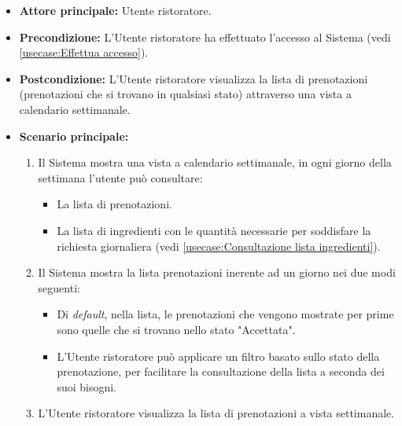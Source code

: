 \begin{itemize}
	\item \textbf{Attore principale:} Utente ristoratore.

	\item \textbf{Precondizione:} L'Utente ristoratore ha effettuato l'accesso al Sistema (vedi \autoref{usecase:Effettua accesso}).

	\item \textbf{Postcondizione:} L'Utente ristoratore visualizza la lista di prenotazioni (prenotazioni che si trovano in qualsiasi stato) attraverso una vista a calendario settimanale.

	\item \textbf{Scenario principale:}
	      \begin{enumerate}
		      \item Il Sistema mostra una vista a calendario settimanale, in ogni giorno della settimana l'utente può consultare:
		            \begin{itemize}
			            \item La lista di prenotazioni.
			            \item La lista di ingredienti con le quantità necessarie per soddisfare la richiesta giornaliera (vedi \autoref{usecase:Consultazione lista ingredienti}).
		            \end{itemize}

		      \item Il Sistema mostra la lista prenotazioni inerente ad un giorno nei due modi seguenti:
		            \begin{itemize}
			            \item Di \textit{default}, nella lista, le prenotazioni che vengono mostrate per prime sono quelle che si trovano nello stato "Accettata".

			            \item L'Utente ristoratore può applicare un filtro basato sullo stato della prenotazione, per facilitare la consultazione della lista a seconda dei suoi bisogni.
		            \end{itemize}

		      \item L'Utente ristoratore visualizza la lista di prenotazioni a vista settimanale.
	      \end{enumerate}
\end{itemize}


